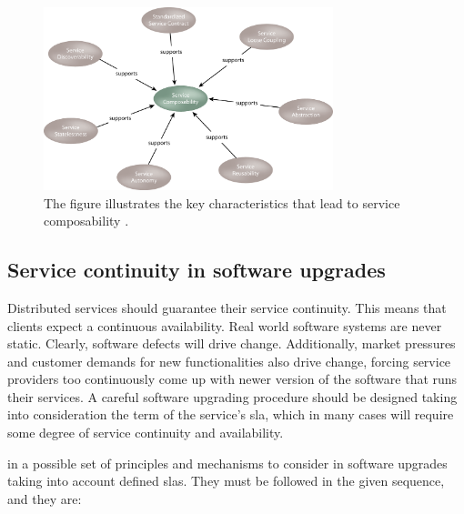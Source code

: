 \begin{figure}
	\centering{}
	\includegraphics[width=0.75\textwidth]{chapters/elasticity/images/composability.png}
	\caption[Characterstics for service composability]{The figure illustrates the key characteristics that
		lead to service composability \cite{serviceComposability}.}
	\label{img:elasticity-requirements-composability}
\end{figure}

\subsection{Service continuity in software upgrades}
\label{sec:elasticity-requirements-serviceContinutiy}
Distributed services should guarantee their service continuity. This means that clients expect a
continuous availability. Real world software systems are never static. Clearly, software defects will
drive change. Additionally, market pressures and customer demands for new functionalities also drive
change, forcing service providers too continuously come up with newer version of the software that
runs their services. A careful software upgrading procedure should be designed taking into consideration
the term of the service's \ac{sla}, which in many cases will require some degree of service continuity
and availability.

\citeauthor{li2011evaluating} in \cite{li2011evaluating} a possible set of principles and mechanisms to
consider in software upgrades taking into account defined \ac{sla}s. They must be followed in the given
sequence, and they are:

